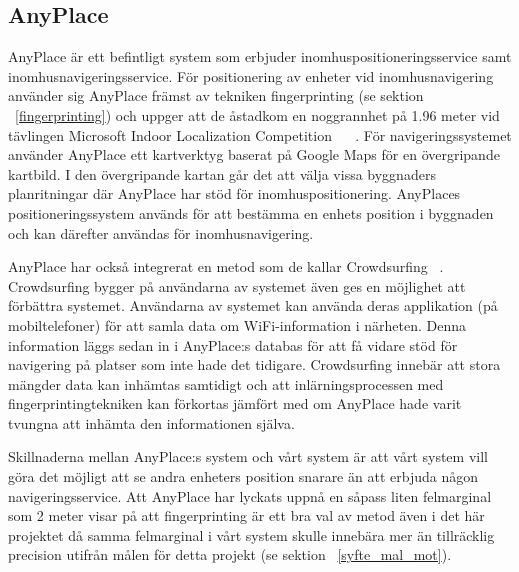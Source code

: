 \documentclass[a4paper,12pt]{article}
\begin{document}
 \subsection{AnyPlace}
 AnyPlace är ett befintligt system som erbjuder inomhuspositioneringsservice samt inomhusnavigeringsservice. För positionering av enheter vid inomhusnavigering använder sig AnyPlace främst av tekniken fingerprinting (se sektion ~\ref{fingerprinting}) och uppger att de åstadkom en noggrannhet på 1.96 meter vid tävlingen Microsoft Indoor Localization Competition ~\cite{anyplace}
 ~\cite{IPS_tavling}.
 För navigeringssystemet använder AnyPlace ett kartverktyg baserat på Google Maps för en övergripande kartbild. I den övergripande kartan går det att välja vissa byggnaders planritningar där AnyPlace har stöd för inomhuspositionering. AnyPlaces positioneringssystem används för att bestämma en enhets position i byggnaden och kan därefter användas för inomhusnavigering.

 AnyPlace har också integrerat en metod som de kallar Crowdsurfing ~\cite{anyplace}. Crowdsurfing bygger på användarna av systemet även ges en möjlighet att förbättra systemet. Användarna av systemet kan använda deras applikation (på mobiltelefoner) för att samla data om WiFi-information i närheten. Denna information läggs sedan in i AnyPlace:s databas för att få vidare stöd för navigering på platser som inte hade det tidigare. Crowdsurfing innebär att stora mängder data kan inhämtas samtidigt och att inlärningsprocessen med fingerprintingtekniken kan förkortas jämfört med om AnyPlace hade varit tvungna att inhämta den informationen själva.

 Skillnaderna mellan AnyPlace:s system och vårt system är att vårt system vill göra det möjligt att se andra enheters position snarare än att erbjuda någon navigeringsservice. Att AnyPlace har lyckats uppnå en såpass liten felmarginal som 2 meter visar på att fingerprinting är ett bra val av metod även i det här projektet då samma felmarginal i vårt system skulle innebära mer än tillräcklig precision utifrån målen för detta projekt (se sektion ~\ref{syfte_mal_mot}).


\end{document}
